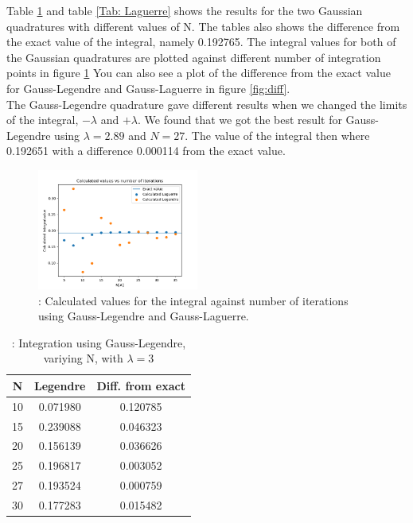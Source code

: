 \documentclass{article}
\begin{document}
Table \ref{Tab: Legendre} and table \ref{Tab: Laguerre} shows the results for the two Gaussian quadratures with different values of N. The tables also shows the difference from the exact value of the integral, namely 0.192765. The integral values for both of the Gaussian quadratures are plotted against different number of integration points in figure \ref{fig:int} You can also see a plot of the difference from the exact value for Gauss-Legendre and Gauss-Laguerre in figure \ref{fig:diff}.\\

The Gauss-Legendre quadrature gave different results when we changed the limits of the integral, $-\lambda$ and $+\lambda$. We found that we got the best result for Gauss-Legendre using $\lambda = 2.89$ and $N=27$. The value of the integral then where 0.192651 with a difference 0.000114 from the exact value.

\begin{figure}[hbt]
\begin{center}
    \includegraphics[width=200px]{Leg_lag_int.png}
    \caption{: Calculated values for the integral against number of iterations using Gauss-Legendre and Gauss-Laguerre.}
    \label{fig:int}
\end{center}
\end{figure}

\begin{table}[h!]
  \caption{: Integration using Gauss-Legendre, variying N, with $\lambda=3$ }
    \label{Tab: Legendre}
  \begin{tabular}{c c c}
    N & Legendre & Diff. from exact \\
    \hline
    10 & 0.071980 & 0.120785 \\
    15 & 0.239088 & 0.046323 \\
    20 & 0.156139 & 0.036626 \\
    25 & 0.196817 & 0.003052 \\
    27 & 0.193524 & 0.000759 \\
    30 & 0.177283 & 0.015482 \\
  \end{tabular}

\end{table}
\end{document}
